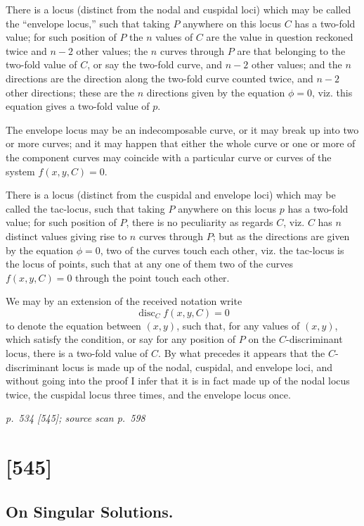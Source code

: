 \documentclass[11pt,a4paper]{article}
\newcommand{\sourcepage}[3]{%
  \bigskip
  \noindent\textit{p.~#1 [#2]; source scan p.~#3}%
  \par\smallskip
}
\begin{document}
There is a locus (distinct from the nodal and cuspidal loci) which may be called
the ``envelope locus,'' such that taking $P$ anywhere on this locus $C$ has a two-fold
value; for such position of $P$ the $n$ values of $C$ are the value in question reckoned
twice and $n-2$ other values; the $n$ curves through $P$ are that belonging to the
two-fold value of $C$, or say the two-fold curve, and $n-2$ other values; and the $n$
directions are the direction along the two-fold curve counted twice, and $n-2$ other
directions; these are the $n$ directions given by the equation $\phi=0$, viz. this equation
gives a two-fold value of $p$.

The envelope locus may be an indecomposable curve, or it may break up into
two or more curves; and it may happen that either the whole curve or one or more
of the component curves may coincide with a particular curve or curves of the system
$f(x,y,C)=0$.

There is a locus (distinct from the cuspidal and envelope loci) which may be
called the tac-locus, such that taking $P$ anywhere on this locus $p$ has a two-fold
value; for such position of $P$, there is no peculiarity as regards $C$, viz. $C$ has $n$
distinct values giving rise to $n$ curves through $P$; but as the directions are given
by the equation $\phi=0$, two of the curves touch each other, viz. the tac-locus is the
locus of points, such that at any one of them two of the curves $f(x,y,C)=0$ through
the point touch each other.

We may by an extension of the received notation write
\[
\operatorname{disc}_{C} f(x,y,C)=0
\]
to denote the equation between $(x,y)$, such that, for any values of $(x,y)$, which satisfy
the condition, or say for any position of $P$ on the $C$-discriminant locus, there is a
two-fold value of $C$. By what precedes it appears that the $C$-discriminant locus is
made up of the nodal, cuspidal, and envelope loci, and without going into the proof
I infer that it is in fact made up of the nodal locus twice, the cuspidal locus three
times, and the envelope locus once.

\clearpage

\sourcepage{534}{545}{598}
\section{[545]}
\subsection{On Singular Solutions.}
\end{document}
